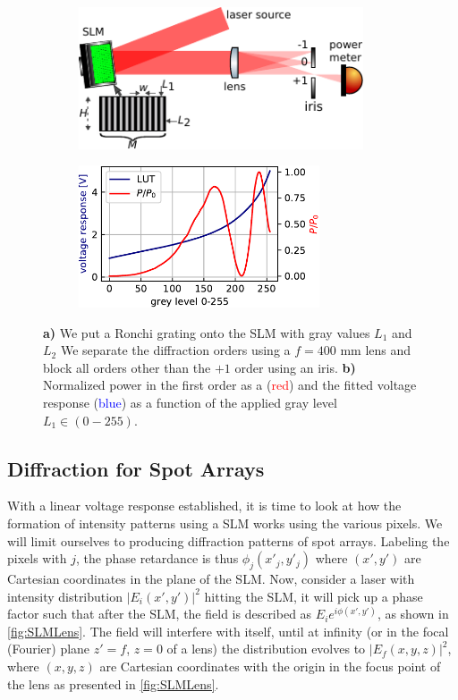 \begin{figure}
	\begin{subfigure}{.54\linewidth}
	    \flushleft
		\includegraphics[height=4.2cm]{figures/LUTcalibrationSetup.pdf}
		\caption{}
		\label{fig:LUTCalibrationSetup}
	\end{subfigure}
	\hfill
	\begin{subfigure}{.44\linewidth}
	    \flushright
		\includegraphics[height=4.2cm]{figures/LUTplot.pdf}
		\caption{}
		\label{fig:LUTcalibration}
	\end{subfigure}
	\caption{\textbf{a)} We put a Ronchi grating onto the SLM with gray values $L_1$ and $L_2$ We separate the diffraction orders using a $f=400$ mm lens and block all orders other than the $+1$ order using an iris. 
	\textbf{b)} Normalized power in the first order as a (\textcolor{red}{red}) and the fitted voltage response (\textcolor{blue}{blue}) as a function of the applied gray level $L_1 \in (0-255)$.}
\end{figure}


\subsection{Diffraction for Spot Arrays}\label{sec:PropagationDerivation}

With a linear voltage response established, it is time to look at how the formation of intensity patterns using a SLM works using the various pixels.
We will limit ourselves to producing diffraction patterns of spot arrays.
Labeling the pixels with $j$, the phase retardance is thus $\phi_j(x'_j,y'_j)$ where $(x',y')$ are Cartesian coordinates in the plane of the SLM.
Now, consider a laser with intensity distribution $|E_i(x',y')|^2$ hitting the SLM, it will pick up a phase factor such that after the SLM, the field is described as $E_i e^{i\phi(x',y')}$, as shown in \cref{fig:SLMLens}. 
The field will interfere with itself, until at infinity (or in the focal (Fourier) plane $z'=f$, $z=0$ of a lens) the distribution evolves to $|E_f(x,y,z)|^2$, where $(x,y,z)$ are Cartesian coordinates with the origin in the focus point of the lens as presented in \cref{fig:SLMLens}.

